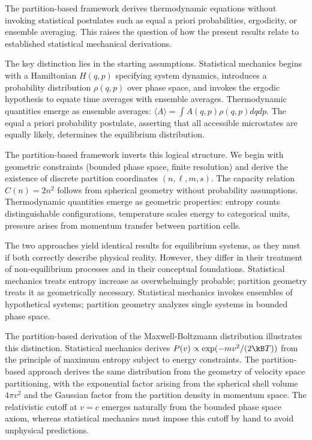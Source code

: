 The partition-based framework derives thermodynamic equations without invoking statistical postulates such as equal a priori probabilities, ergodicity, or ensemble averaging. This raises the question of how the present results relate to established statistical mechanical derivations.

The key distinction lies in the starting assumptions. Statistical mechanics begins with a Hamiltonian $H(q,p)$ specifying system dynamics, introduces a probability distribution $\rho(q,p)$ over phase space, and invokes the ergodic hypothesis to equate time averages with ensemble averages. Thermodynamic quantities emerge as ensemble averages: $\langle A \rangle = \int A(q,p) \rho(q,p) dq dp$. The equal a priori probability postulate, asserting that all accessible microstates are equally likely, determines the equilibrium distribution.

The partition-based framework inverts this logical structure. We begin with geometric constraints (bounded phase space, finite resolution) and derive the existence of discrete partition coordinates $(n,\ell,m,s)$. The capacity relation $C(n) = 2n^2$ follows from spherical geometry without probability assumptions. Thermodynamic quantities emerge as geometric properties: entropy counts distinguishable configurations, temperature scales energy to categorical units, pressure arises from momentum transfer between partition cells.

The two approaches yield identical results for equilibrium systems, as they must if both correctly describe physical reality. However, they differ in their treatment of non-equilibrium processes and in their conceptual foundations. Statistical mechanics treats entropy increase as overwhelmingly probable; partition geometry treats it as geometrically necessary. Statistical mechanics invokes ensembles of hypothetical systems; partition geometry analyzes single systems in bounded phase space.

The partition-based derivation of the Maxwell-Boltzmann distribution illustrates this distinction. Statistical mechanics derives $P(v) \propto \exp(-mv^2/(2\kB T))$ from the principle of maximum entropy subject to energy constraints. The partition-based approach derives the same distribution from the geometry of velocity space partitioning, with the exponential factor arising from the spherical shell volume $4\pi v^2$ and the Gaussian factor from the partition density in momentum space. The relativistic cutoff at $v = c$ emerges naturally from the bounded phase space axiom, whereas statistical mechanics must impose this cutoff by hand to avoid unphysical predictions.

